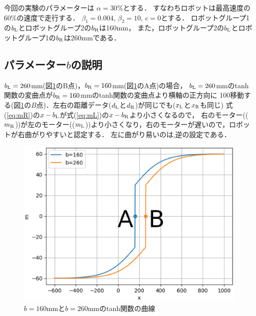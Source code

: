 今回の実験のパラメーターは
$\alpha=30\%$とする．
すなわちロボットは最高速度の60\%の速度で走行する．
$\beta_1=0.004$,
$\beta_2=10$,
$c=0$とする．
ロボットグループ1の$b_{\rm L}$とロボットグループ2の$b_{\rm R}$は160mm，
また，ロボットグループ2の$b_{\rm L}$とロボットグループ1の$b_{\rm R}$は260mmである．

\subsection{パラメーター$b$の説明}
$b_{\rm L}=260$mm(図\ref{fitan}のB点)，$b_{\rm R}=160$mm(図\ref{fitan}のA点)の場合，
$b_{\rm L}=260$mmのtanh関数の変曲点が$b_{\rm R}=160$mmのtanh関数の変曲点より横軸の正方向に
100移動する(図\ref{fitan}の$B$点)．左右の距離データ($d_{\rm L}$と$d_{\rm R}$)が同じでも($x_{\rm L}$と$x_{\rm R}$も同じ)
式(\ref{eq:mR})の$x-b_{\rm L}$が式(\ref{eq:mL})の$x-b_{\rm R}$より小さくなるので，
右のモーター(($m_{\rm R}$))が左のモーター(($m_{\rm L}$))より小さくなり，右のモーターが遅いので，ロボットが右曲がりやすいと認定する．
左に曲がり易いのは,逆の設定である．
\begin{figure}[!ht]
    \centering
    \includegraphics[width=0.7\linewidth]{tanh.eps} 
    \caption{$b=160$mmと$b=260$mmのtanh関数の曲線}
    \label{fitan}
\end{figure}

